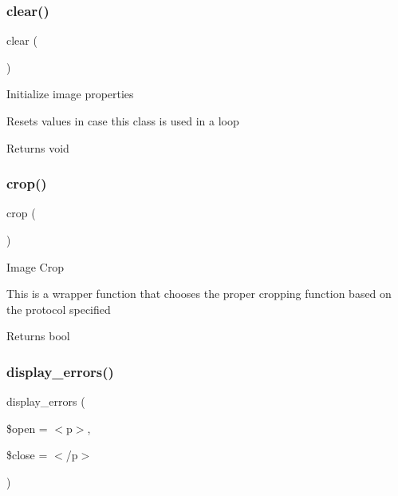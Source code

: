 \subsubsection{\texorpdfstring{clear()}{clear()}}
{\footnotesize\ttfamily clear (\begin{DoxyParamCaption}{ }\end{DoxyParamCaption})}

Initialize image properties

Resets values in case this class is used in a loop

\begin{DoxyReturn}{Returns}
void 
\end{DoxyReturn}
\mbox{\label{class_c_i___image__lib_a77248c0134d1b117eb36774ecee6e04c}} 
\subsubsection{\texorpdfstring{crop()}{crop()}}
{\footnotesize\ttfamily crop (\begin{DoxyParamCaption}{ }\end{DoxyParamCaption})}

Image Crop

This is a wrapper function that chooses the proper cropping function based on the protocol specified

\begin{DoxyReturn}{Returns}
bool 
\end{DoxyReturn}
\mbox{\label{class_c_i___image__lib_a71a6f2e6d97ff5347257f101002bc903}} 
\subsubsection{\texorpdfstring{display\+\_\+errors()}{display\_errors()}}
{\footnotesize\ttfamily display\+\_\+errors (\begin{DoxyParamCaption}\item[{}]{\$open = {\ttfamily \textquotesingle{}$<$p$>$\textquotesingle{}},  }\item[{}]{\$close = {\ttfamily \textquotesingle{}$<$/p$>$\textquotesingle{}} }\end{DoxyParamCaption})}

